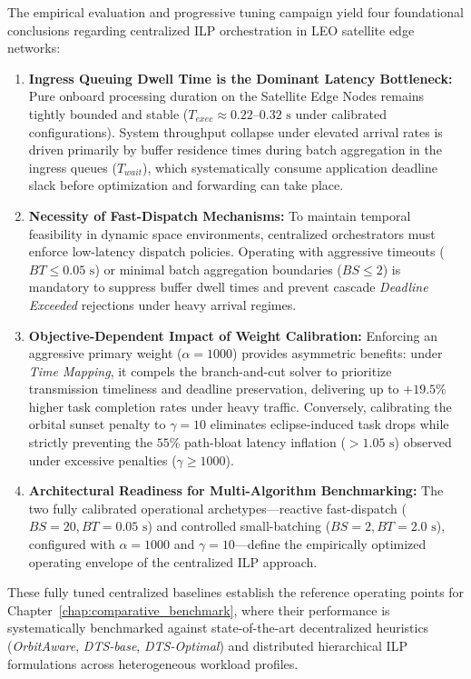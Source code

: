 The empirical evaluation and progressive tuning campaign yield four foundational conclusions regarding centralized ILP orchestration in LEO satellite edge networks:
\begin{enumerate}
    \item \textbf{Ingress Queuing Dwell Time is the Dominant Latency Bottleneck:} 
    Pure onboard processing duration on the Satellite Edge Nodes remains tightly bounded and stable ($T_{exec} \approx 0.22\text{--}0.32\text{ s}$ under calibrated configurations). System throughput collapse under elevated arrival rates is driven primarily by buffer residence times during batch aggregation in the ingress queues ($T_{wait}$), which systematically consume application deadline slack before optimization and forwarding can take place.

    \item \textbf{Necessity of Fast-Dispatch Mechanisms:} 
    To maintain temporal feasibility in dynamic space environments, centralized orchestrators must enforce low-latency dispatch policies. Operating with aggressive timeouts ($BT \le 0.05\text{ s}$) or minimal batch aggregation boundaries ($BS \le 2$) is mandatory to suppress buffer dwell times and prevent cascade \textit{Deadline Exceeded} rejections under heavy arrival regimes.

    \item \textbf{Objective-Dependent Impact of Weight Calibration:} 
    Enforcing an aggressive primary weight ($\alpha = 1000$) provides asymmetric benefits: under \textit{Time Mapping}, it compels the branch-and-cut solver to prioritize transmission timeliness and deadline preservation, delivering up to $+19.5\%$ higher task completion rates under heavy traffic. Conversely, calibrating the orbital sunset penalty to $\gamma = 10$ eliminates eclipse-induced task drops while strictly preventing the $55\%$ path-bloat latency inflation ($> 1.05\text{ s}$) observed under excessive penalties ($\gamma \ge 1000$).

    \item \textbf{Architectural Readiness for Multi-Algorithm Benchmarking:} 
    The two fully calibrated operational archetypes—reactive fast-dispatch ($BS=20, BT=0.05\text{ s}$) and controlled small-batching ($BS=2, BT=2.0\text{ s}$), configured with $\alpha=1000$ and $\gamma=10$—define the empirically optimized operating envelope of the centralized ILP approach.
\end{enumerate}

These fully tuned centralized baselines establish the reference operating points for Chapter~\ref{chap:comparative_benchmark}, where their performance is systematically benchmarked against state-of-the-art decentralized heuristics (\textit{OrbitAware}, \textit{DTS-base}, \textit{DTS-Optimal}) and distributed hierarchical ILP formulations across heterogeneous workload profiles.